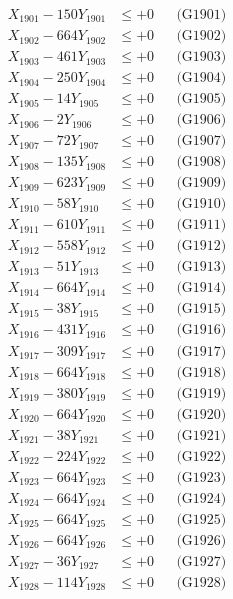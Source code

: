 \documentclass[a4paper,10pt]{article}
\begin{document}
{\begin{align}
\allowbreak
X_{1901} - 150Y_{1901} &\leq +0 && \text{(G1901)} \\
X_{1902} - 664Y_{1902} &\leq +0 && \text{(G1902)} \\
X_{1903} - 461Y_{1903} &\leq +0 && \text{(G1903)} \\
X_{1904} - 250Y_{1904} &\leq +0 && \text{(G1904)} \\
X_{1905} - 14Y_{1905} &\leq +0 && \text{(G1905)} \\
X_{1906} - 2Y_{1906} &\leq +0 && \text{(G1906)} \\
X_{1907} - 72Y_{1907} &\leq +0 && \text{(G1907)} \\
X_{1908} - 135Y_{1908} &\leq +0 && \text{(G1908)} \\
X_{1909} - 623Y_{1909} &\leq +0 && \text{(G1909)} \\
X_{1910} - 58Y_{1910} &\leq +0 && \text{(G1910)} \\
\allowbreak
X_{1911} - 610Y_{1911} &\leq +0 && \text{(G1911)} \\
X_{1912} - 558Y_{1912} &\leq +0 && \text{(G1912)} \\
X_{1913} - 51Y_{1913} &\leq +0 && \text{(G1913)} \\
X_{1914} - 664Y_{1914} &\leq +0 && \text{(G1914)} \\
X_{1915} - 38Y_{1915} &\leq +0 && \text{(G1915)} \\
X_{1916} - 431Y_{1916} &\leq +0 && \text{(G1916)} \\
X_{1917} - 309Y_{1917} &\leq +0 && \text{(G1917)} \\
X_{1918} - 664Y_{1918} &\leq +0 && \text{(G1918)} \\
X_{1919} - 380Y_{1919} &\leq +0 && \text{(G1919)} \\
X_{1920} - 664Y_{1920} &\leq +0 && \text{(G1920)} \\
\allowbreak
X_{1921} - 38Y_{1921} &\leq +0 && \text{(G1921)} \\
X_{1922} - 224Y_{1922} &\leq +0 && \text{(G1922)} \\
X_{1923} - 664Y_{1923} &\leq +0 && \text{(G1923)} \\
X_{1924} - 664Y_{1924} &\leq +0 && \text{(G1924)} \\
X_{1925} - 664Y_{1925} &\leq +0 && \text{(G1925)} \\
X_{1926} - 664Y_{1926} &\leq +0 && \text{(G1926)} \\
X_{1927} - 36Y_{1927} &\leq +0 && \text{(G1927)} \\
X_{1928} - 114Y_{1928} &\leq +0 && \text{(G1928)} \\

\end{align}}
\end{document}
